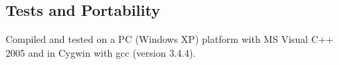
\subsection{Tests and Portability}
Compiled and tested on a PC (Windows XP) platform with MS Visual C++ 2005 and 
in Cygwin with gcc (version 3.4.4).

